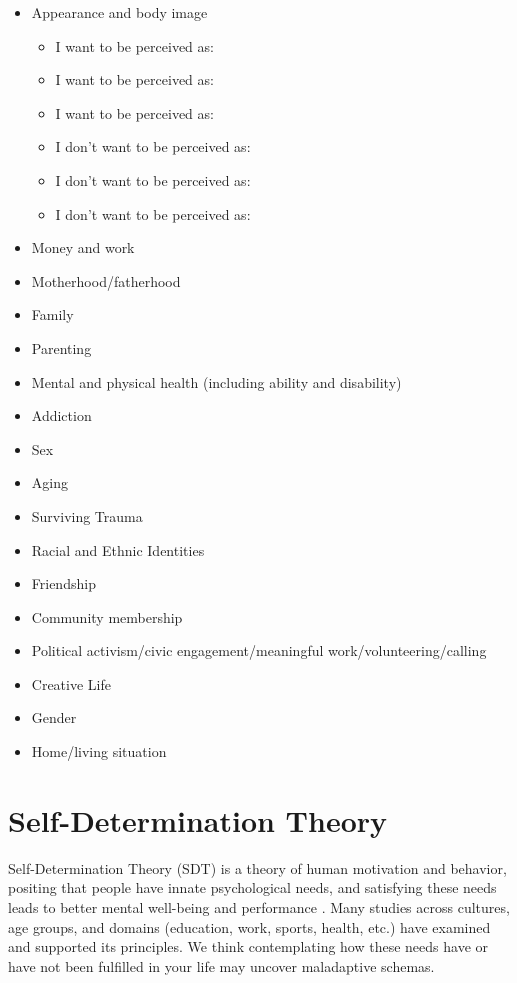 \documentclass[12pt,letterpaper]{book}
\begin{document}
\begin{itemize}
    \item Appearance and body image
    \begin{itemize}
        \item I want to be perceived as:
        \item I want to be perceived as:
        \item I want to be perceived as:
        \item I don't want to be perceived as:
        \item I don't want to be perceived as:
        \item I don't want to be perceived as:
    \end{itemize}
    \item Money and work
    \item Motherhood/fatherhood
    \item Family
    \item Parenting
    \item Mental and physical health (including ability and disability)
    \item Addiction
    \item Sex
    \item Aging
    \item Surviving Trauma
    \item Racial and Ethnic Identities
    \item Friendship
    \item Community membership
    \item Political activism/civic engagement/meaningful work/volunteering/calling
    \item Creative Life
    \item Gender
    \item Home/living situation
\end{itemize}
\chapter{Self-Determination Theory}
\label{sec:sdt}
Self-Determination Theory (SDT) is a theory of human motivation and behavior, positing that people have innate psychological needs, and satisfying these needs leads to better mental well-being and performance \cite{deciSDT}. Many studies across cultures, age groups, and domains (education, work, sports, health, etc.) have examined and supported its principles. We think contemplating how these needs have or have not been fulfilled in your life may uncover maladaptive schemas.
\end{document}
